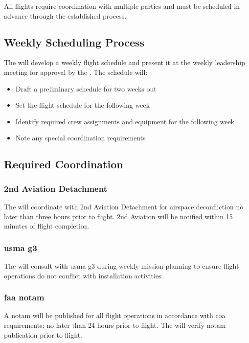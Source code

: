 All \projectmars{} flights require coordination with multiple parties and must be scheduled in advance through the established process.

    \subsection{Weekly Scheduling Process}\label{ssec:weeklyschedule}

        The  will develop a weekly flight schedule and present it at the weekly leadership meeting for approval by the . The schedule will:

        \begin{itemize}
            \item Draft a preliminary schedule for two weeks out  
            \item Set the flight schedule for the following week
            \item Identify required crew assignments and equipment for the following week
            \item Note any special coordination requirements
        \end{itemize}

    \subsection{Required Coordination}\label{ssec:requiredcoord}

        \subsubsection{2nd Aviation Detachment} The  will coordinate with 2nd Aviation Detachment for airspace deconfliction no later than three hours prior to flight. 2nd Aviation will be notified within 15 minutes of flight completion.

        \subsubsection{\ac{usma} \ac{g3}} The  will consult with \ac{usma} \ac{g3} during weekly mission planning to ensure flight operations do not conflict with installation activities.

        \subsubsection{\ac{faa} \ac{notam}} A \ac{notam} will be published for all flight operations in accordance with \ac{coa} requirements; no later than 24 hours prior to flight. The  will verify \ac{notam} publication prior to flight.


